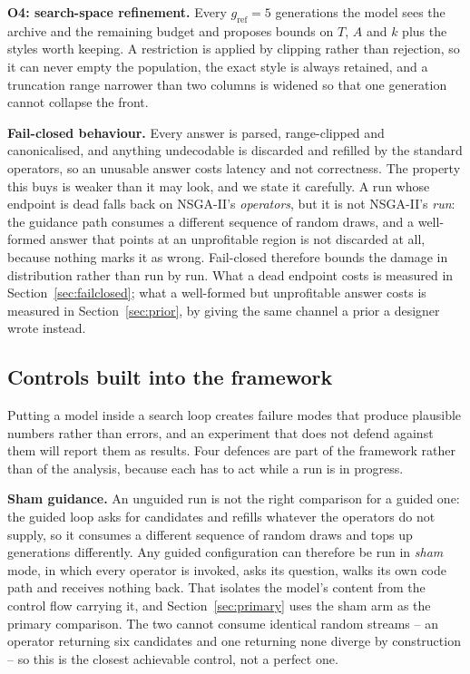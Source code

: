 \documentclass[acmsmall,review,anonymous]{acmart}
\begin{document}
\textbf{O4: search-space refinement.}  Every $g_{\mathrm{ref}}=5$ generations
the model sees the archive and the remaining budget and proposes bounds on $T$,
$A$ and $k$ plus the styles worth keeping.  A restriction is applied by
clipping rather than rejection, so it can never empty the population, the exact
style is always retained, and a truncation range narrower than two columns is
widened so that one generation cannot collapse the front.

\textbf{Fail-closed behaviour.}  Every answer is parsed, range-clipped and
canonicalised, and anything undecodable is discarded and refilled by the
standard operators, so an unusable answer costs latency and not correctness.
The property this buys is weaker than it may look, and we state it carefully.
A run whose endpoint is dead falls back on NSGA-II's \emph{operators}, but it
is not NSGA-II's \emph{run}: the guidance path consumes a different sequence of
random draws, and a well-formed answer that points at an unprofitable region is
not discarded at all, because nothing marks it as wrong.  Fail-closed therefore
bounds the damage in distribution rather than run by run.  What a dead endpoint
costs is measured in Section~\ref{sec:failclosed}; what a well-formed but
unprofitable answer costs is measured in Section~\ref{sec:prior}, by giving the
same channel a prior a designer wrote instead.

\subsection{Controls built into the framework}
\label{sec:controls}
Putting a model inside a search loop creates failure modes that produce
plausible numbers rather than errors, and an experiment that does not defend
against them will report them as results.  Four defences are part of the
framework rather than of the analysis, because each has to act while a run is
in progress.

\textbf{Sham guidance.}  An unguided run is not the right comparison for a
guided one: the guided loop asks for candidates and refills whatever the
operators do not supply, so it consumes a different sequence of random draws
and tops up generations differently.  Any guided configuration can therefore be
run in \emph{sham} mode, in which every operator is invoked, asks its question,
walks its own code path and receives nothing back.  That isolates the model's
content from the control flow carrying it, and Section~\ref{sec:primary} uses
the sham arm as the primary comparison.  The two cannot consume identical random
streams -- an operator returning six candidates and one returning none diverge
by construction -- so this is the closest achievable control, not a perfect
one.
\end{document}
